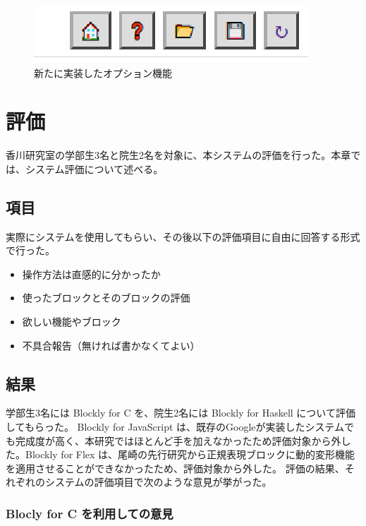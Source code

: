 \documentclass{eniepaper}
\begin{document}
\begin{figure}[h]
\begin{center}
\includegraphics[scale=0.5]{img/option_button.eps}
\caption{新たに実装したオプション機能}%
\label{fig:option_button}
\end{center}%
\end{figure}%



   \chapter{評価}
   
香川研究室の学部生3名と院生2名を対象に、本システムの評価を行った。本章では、システム評価について述べる。
   
   \section{項目}
   
実際にシステムを使用してもらい、その後以下の評価項目に自由に回答する形式で行った。

\begin{itemize}
\item 操作方法は直感的に分かったか
\item 使ったブロックとそのブロックの評価
\item 欲しい機能やブロック
\item 不具合報告（無ければ書かなくてよい）
\end{itemize} 
   
   \section{結果}

学部生3名には Blockly for C を、院生2名には Blockly for Haskell について評価してもらった。
Blockly for JavaScript は、既存のGoogleが実装したシステムでも完成度が高く、本研究ではほとんど手を加えなかったため評価対象から外した。Blockly for Flex は、尾崎の先行研究から正規表現ブロックに動的変形機能を適用させることができなかったため、評価対象から外した。
評価の結果、それぞれのシステムの評価項目で次のような意見が挙がった。

   \subsection{Blocly for C を利用しての意見}
   
\end{document}
